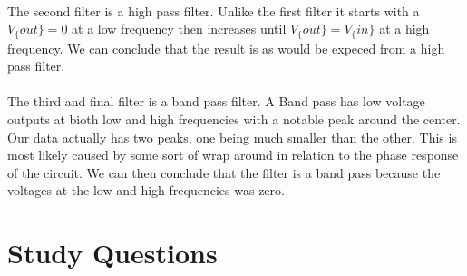 \documentclass{article}
\begin{document}
\paragraph{}
The second filter is a high pass filter. Unlike the first filter it starts with a $V_\{out\} = 0$ at a low frequency
 then increases until $V_\{out\} = V_\{in\}$ at a high frequency. We can conclude that the result is as would be 
 expeced from a high pass filter.
 \paragraph{}
 The third and final filter is a band pass filter. A Band pass has low voltage outputs at bioth low and high frequencies 
 with a notable peak around the center. Our data actually has two peaks, one being much smaller than the other. This 
 is most likely caused by some sort of wrap around in relation to the phase response of the circuit. We can then conclude
 that the filter is a band pass because the voltages at the low and high frequencies was zero.

\section*{Study Questions}
\end{document}
